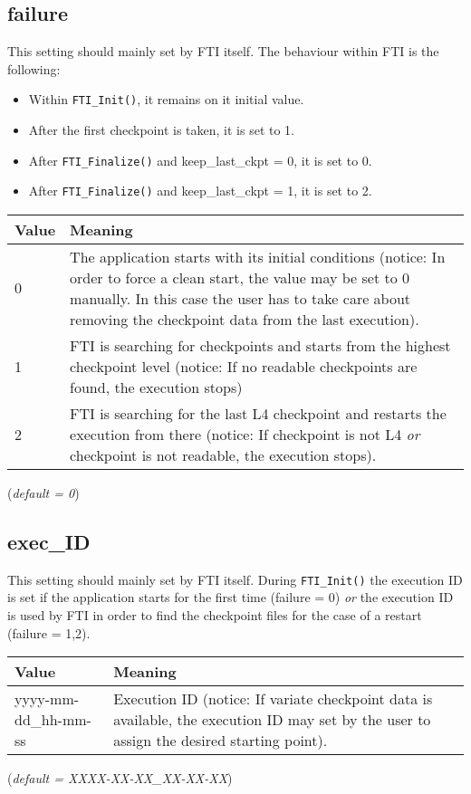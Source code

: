 \documentclass{refrep}
\begin{document}
\subsection{failure}\label{subsec:failure}
This setting should mainly set by FTI itself. The behaviour within FTI is the following:
\begin{itemize}
\item Within {\tt FTI\_Init()}, it remains on it initial value.
\item After the first checkpoint is taken, it is set to 1.
\item After {\tt FTI\_Finalize()} and keep\_last\_ckpt = 0, it is set to 0.
\item After {\tt FTI\_Finalize()} and keep\_last\_ckpt = 1, it is set to 2.
\end{itemize}
\begin{center}
\begin{tabular}[h!]{|p{}|p{}|}
\hline
\textbf{Value} & \textbf{Meaning} \\ \hline
0 & The application starts with its initial conditions (notice: In order to force a clean start, the value may be set to 0 manually. In this case the user has to take care about removing the checkpoint data from the last execution).  \\ \hline
1 & FTI is searching for checkpoints and starts from the highest checkpoint level (notice: If no readable checkpoints are found, the execution stops) \\ \hline
2 & FTI is searching for the last L4 checkpoint and restarts the execution from there (notice: If checkpoint is not L4 \emph{or} checkpoint is not readable, the execution stops).  \\ \hline
\end{tabular}
\end{center}
(\textit{default = 0})
\subsection{exec\_ID}\label{subsec:execid}
This setting should mainly set by FTI itself. During {\tt FTI\_Init()} the execution ID is set if the application starts for the first time (failure = 0) \emph{or} the execution ID is used by FTI in order to find the checkpoint files for the case of a restart (failure = 1,2).
\begin{center}
\begin{tabular}[h!]{|p{}|p{}|}
\hline
\textbf{Value} & \textbf{Meaning} \\ \hline
yyyy-mm-dd\_hh-mm-ss & Execution ID (notice: If variate checkpoint data is available, the execution ID may set by the user to assign the desired starting point). \\ \hline
\end{tabular}
\end{center}
(\textit{default = XXXX-XX-XX\_XX-XX-XX})
\end{document}
